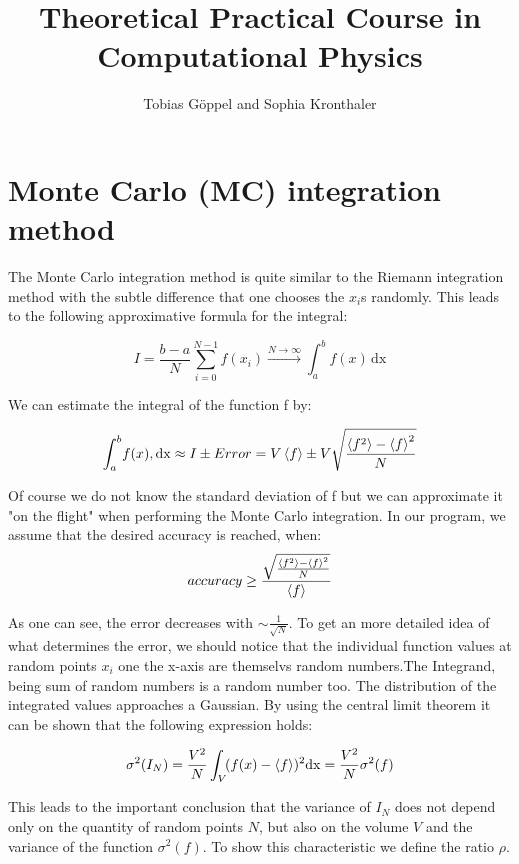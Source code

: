 \documentclass[12pt,a4paper,titlepage]{article}
\author{Tobias G\"oppel and Sophia Kronthaler}
\title{Theoretical Practical Course in Computational Physics}
\begin{document}
\maketitle

\newpage
\tableofcontents
\newpage

\section{Monte Carlo (MC) integration method} 

The Monte Carlo integration method is quite similar to the Riemann integration method with the subtle difference that one chooses the $x_i$s randomly. This leads to the following approximative formula for the integral:

\begin{equation}
I = \frac{b-a}{N} \sum_{i=0}^{N-1} f(x_i) \xrightarrow{N\rightarrow \infty} \int_a^b\! f(x)\, \mathrm{dx}
\end{equation}
												

We can estimate the integral of the function f by:

\begin{equation}
\int_a^b\! f(x),\mathrm{dx} \approx I \pm Error = V \braket{f} \pm V \sqrt{\frac{\braket{f^2}-\braket{f}^2}{N}} 
\end{equation}

Of course we do not know the standard deviation of f but we can approximate it "on the flight" when performing the Monte Carlo integration. In our program, we assume that the desired accuracy is
reached, when:
\[accuracy \geq \frac{\sqrt{\frac{\braket{f^2}-\braket{f}^2}{N}}}{\braket{f}} \]


As one can see, the error decreases with $\sim \frac{1}{\sqrt{N}}$.
To get an more detailed idea of what determines the error, we should notice that the individual function values at random points $x_i$ one the x-axis are themselvs random numbers.The Integrand, being sum of random numbers is a random number too. The distribution of the integrated values approaches a Gaussian. By using the central limit theorem it can be shown that the following expression holds:

\begin{equation}
\sigma^2(I_N) = \frac{V^2}{N} \int_V \!(f(x) - \braket{f})^2 \mathrm{dx}=\frac{V^2}{N}\sigma^2(f)
\end{equation}

This leads to the important conclusion that the variance of $I_N$ does not depend only on the quantity of random points $N$, but also on the volume $V$ and the variance of the function $\sigma^2(f)$.
To show this characteristic we define the ratio $\rho$.
\end{document}
